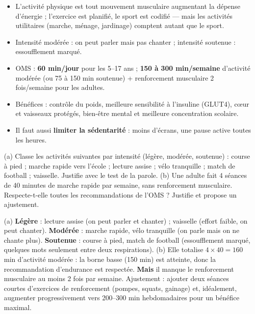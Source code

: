\documentclass[11pt]{article}
\newcommand{\cle}[1]{{\popxbold\color{popdark}#1}}
\begin{document}
\begin{aretenir}
\begin{itemize}
\item L'\cle{activité physique} est tout mouvement musculaire augmentant la dépense d'énergie ; l'exercice est planifié, le sport est codifié — mais les activités utilitaires (marche, ménage, jardinage) comptent autant que le sport.
\item Intensité \cle{modérée} : on peut parler mais pas chanter ; intensité \cle{soutenue} : essoufflement marqué.
\item OMS : \textbf{60 min/jour} pour les 5--17 ans ; \textbf{150 à 300 min/semaine} d'activité modérée (ou 75 à 150 min soutenue) + renforcement musculaire 2 fois/semaine pour les adultes.
\item Bénéfices : contrôle du poids, meilleure sensibilité à l'insuline (GLUT4), cœur et vaisseaux protégés, bien-être mental et meilleure concentration scolaire.
\item Il faut aussi \textbf{limiter la sédentarité} : moins d'écrans, une pause active toutes les heures.
\end{itemize}
\end{aretenir}

\begin{exercice}
(a) Classe les activités suivantes par intensité (légère, modérée, soutenue) : course à pied ; marche rapide vers l'école ; lecture assise ; vélo tranquille ; match de football ; vaisselle. Justifie avec le test de la parole. (b) Une adulte fait 4 séances de 40 minutes de marche rapide par semaine, sans renforcement musculaire. Respecte-t-elle toutes les recommandations de l'OMS ? Justifie et propose un ajustement.
\end{exercice}

\begin{corrige}[Exercice]
(a) \textbf{Légère} : lecture assise (on peut parler et chanter) ; vaisselle (effort faible, on peut chanter). \textbf{Modérée} : marche rapide, vélo tranquille (on parle mais on ne chante plus). \textbf{Soutenue} : course à pied, match de football (essoufflement marqué, quelques mots seulement entre deux respirations).
(b) Elle totalise $4 \times 40 = 160$ min d'activité modérée : la borne basse (150 min) est atteinte, donc la recommandation d'endurance est respectée. \textbf{Mais} il manque le \cle{renforcement musculaire} au moins 2 fois par semaine. Ajustement : ajouter deux séances courtes d'exercices de renforcement (pompes, squats, gainage) et, idéalement, augmenter progressivement vers 200--300 min hebdomadaires pour un bénéfice maximal.
\end{corrige}
\end{document}
